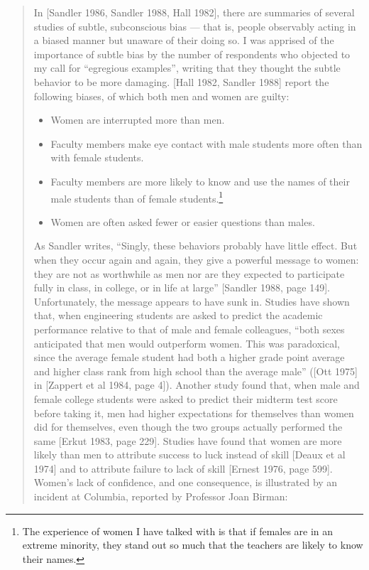 \begin{quote}
In [Sandler 1986, Sandler 1988, Hall 1982], there are summaries
of several studies of subtle, subconscious bias --- that is, people
observably acting in a biased manner but unaware of their doing
so.  I was apprised of the importance of subtle bias by the
number of respondents who objected to my call for ``egregious
examples'', writing that they thought the subtle behavior to be
more damaging. [Hall 1982, Sandler 1988] report the following
biases, of which both men and women are guilty:

   \begin{itemize}
\item
 Women are interrupted more than men.

   \item
 Faculty members make eye contact with male students
     more often than with female students.

   \item
 Faculty members are more likely to know and use the
     names of their male students than of female students.\footnote{The experience of women I have talked with is that if females are in
an extreme minority, they stand out so much that the teachers are likely
to know their names.}
   \item
 Women are often asked fewer or easier questions than
     males.
\end{itemize}

As Sandler writes, ``Singly, these behaviors probably have little
effect. But when they occur again and again, they give a powerful message to women: they are not as worthwhile as men nor
are they expected to participate fully in class, in college, or in
life at large'' [Sandler 1988, page 149]. Unfortunately, the message appears to have sunk in. Studies have shown that, when
engineering students are asked to predict the academic performance relative to that of male and female colleagues, ``both
sexes anticipated that men would outperform women. This was
paradoxical, since the average female student had both a higher
grade point average and higher class rank from high school than
the average male'' ([Ott 1975] in [Zappert et al 1984, page 4]).
Another study found that, when male and female college students were asked to predict their midterm test score before taking it, men had higher expectations for themselves than women
did for themselves, even though the two groups actually performed the same [Erkut 1983, page 229].  Studies have found
that women are more likely than men to attribute success to
luck instead of skill [Deaux et al 1974] and to attribute failure
to lack of skill [Ernest 1976, page 599]. Women's lack of confidence, and one consequence, is illustrated by an incident at
Columbia, reported by Professor Joan Birman:



\end{quote}
